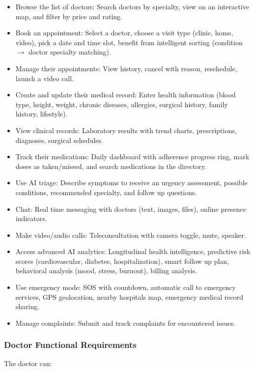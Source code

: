 \documentclass[12pt,a4paper,oneside]{report}
\begin{document}
\begin{itemize}
    \item Browse the list of doctors: Search doctors by specialty, view on an interactive map, and filter by price and rating.
    \item Book an appointment: Select a doctor, choose a visit type (clinic, home, video), pick a date and time slot, benefit from intelligent sorting (condition $\rightarrow$ doctor specialty matching).
    \item Manage their appointments: View history, cancel with reason, reschedule, launch a video call.
    \item Create and update their medical record: Enter health information (blood type, height, weight, chronic diseases, allergies, surgical history, family history, lifestyle).
    \item View clinical records: Laboratory results with trend charts, prescriptions, diagnoses, surgical schedules.
    \item Track their medications: Daily dashboard with adherence progress ring, mark doses as taken/missed, and search medications in the directory.
    \item Use AI triage: Describe symptoms to receive an urgency assessment, possible conditions, recommended specialty, and follow up questions.
    \item Chat: Real time messaging with doctors (text, images, files), online presence indicators.
    \item Make video/audio calls: Teleconsultation with camera toggle, mute, speaker.
    \item Access advanced AI analytics: Longitudinal health intelligence, predictive risk scores (cardiovascular, diabetes, hospitalization), smart follow up plan, behavioral analysis (mood, stress, burnout), billing analysis.
    \item Use emergency mode: SOS with countdown, automatic call to emergency services, GPS geolocation, nearby hospitals map, emergency medical record sharing.
    \item Manage complaints: Submit and track complaints for encountered issues.
\end{itemize}

\subsubsection{Doctor Functional Requirements}

The doctor can:
\end{document}
